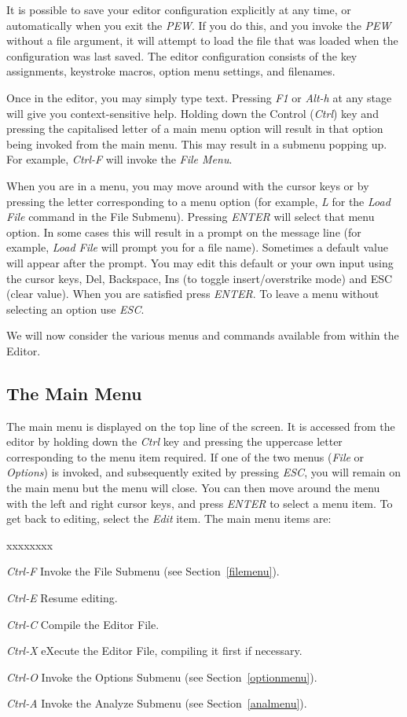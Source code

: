 It is possible to save your editor configuration explicitly at any
time, or automatically when you exit the {\em PEW}. If you do this,
and you invoke the {\em PEW} without a file argument, it will attempt
to load the file that was loaded when the configuration was last
saved. The editor configuration consists of the key assignments,
keystroke macros, option menu settings, and filenames.

Once in the editor, you may simply type text. Pressing {\em F1} or {\em
Alt-h}
at any stage
will give  you context-sensitive  help. Holding down the Control
({\em Ctrl}) key  and pressing  the capitalised  letter of a main menu
option will  result in  that option  being invoked from the main
menu. This may result in a submenu popping up.  For example, 
{\em Ctrl-F} will invoke the {\em File Menu}.

When you are in a menu, you may move around with the cursor keys
or by  pressing the  letter corresponding to a menu option (for
example, {\em L} for the {\em Load File} command in  the File  Submenu).
Pressing {\em ENTER} will select
that menu  option. In some cases this will result in a prompt on
the message  line (for example, {\em Load File} will prompt you for a file name).
Sometimes a  default value will appear after the prompt. You may
edit this  default or your own input using the cursor keys, Del,
Backspace, Ins  (to toggle insert/overstrike  mode) and  ESC (clear
value). When you are satisfied press {\em ENTER}. To leave a menu
without selecting an option use {\em ESC}.

We will now consider the various menus and commands available from
within the Editor.

\subsection[The Main Menu]{The Main Menu}

The main menu is displayed on the top line of the screen. It is
accessed from the editor by holding down the {\em Ctrl} key and
pressing the uppercase letter corresponding to the menu item
required. If one of the two menus ({\em File} or {\em Options}) is
invoked, and subsequently exited by pressing {\em ESC}, you will
remain on the main menu but the menu will close. You can then move
around the menu with the left and right cursor keys, and press {\em
ENTER} to select a menu item. To get back to editing, select the
{\em Edit} item. The main menu items are:

\begin{describe}{xxxxxxxx}
\item[\em Ctrl-F]Invoke the File Submenu (see
Section~\ref{filemenu}).
\item[\em Ctrl-E]Resume editing.
\item[\em Ctrl-C]Compile the Editor File.
\item[\em Ctrl-X]eXecute the Editor File, compiling it first if necessary.
\item[\em Ctrl-O]Invoke the Options Submenu (see
Section~\ref{optionmenu}).
\item[\em Ctrl-A]Invoke the Analyze Submenu (see
Section~\ref{analmenu}).
\end{describe}


